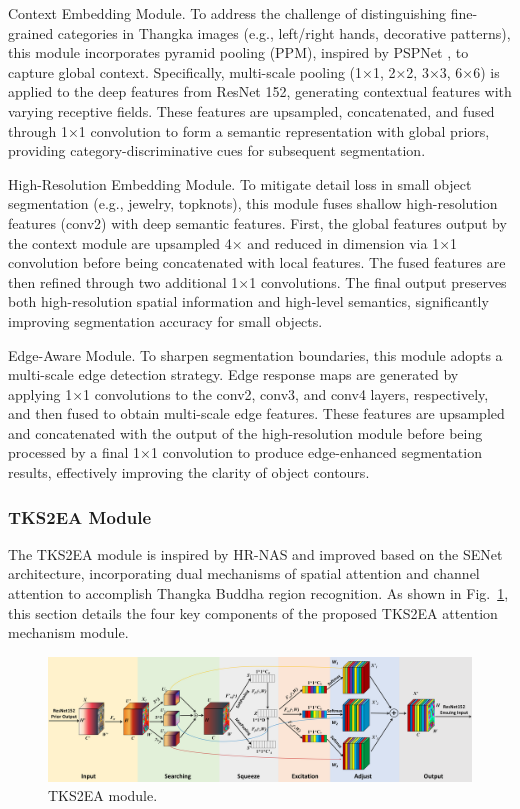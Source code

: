 \documentclass[sn-mathphys]{sn-jnl}%
\theoremstyle{thmstyleone}%
\theoremstyle{thmstyletwo}%
\theoremstyle{thmstylethree}%
\begin{document}
Context Embedding Module. To address the challenge of distinguishing fine-grained categories in Thangka images (e.g., left/right hands, decorative patterns), this module incorporates pyramid pooling (PPM), inspired by PSPNet \cite{b32}, to capture global context. Specifically, multi-scale pooling (1×1, 2×2, 3×3, 6×6) is applied to the deep features from ResNet 152, generating contextual features with varying receptive fields. These features are upsampled, concatenated, and fused through 1×1 convolution to form a semantic representation with global priors, providing category-discriminative cues for subsequent segmentation.

High-Resolution Embedding Module. To mitigate detail loss in small object segmentation (e.g., jewelry, topknots), this module fuses shallow high-resolution features (conv2) with deep semantic features. First, the global features output by the context module are upsampled 4× and reduced in dimension via 1×1 convolution before being concatenated with local features. The fused features are then refined through two additional 1×1 convolutions. The final output preserves both high-resolution spatial information and high-level semantics, significantly improving segmentation accuracy for small objects.

Edge-Aware Module. To sharpen segmentation boundaries, this module adopts a multi-scale edge detection strategy. Edge response maps are generated by applying 1×1 convolutions to the conv2, conv3, and conv4 layers, respectively, and then fused to obtain multi-scale edge features. These features are upsampled and concatenated with the output of the high-resolution module before being processed by a final 1×1 convolution to produce edge-enhanced segmentation results, effectively improving the clarity of object contours. 

\subsubsection{TKS2EA Module}
The TKS2EA module is inspired by HR-NAS \cite{b33} and improved based on the SENet \cite{b34} architecture, incorporating dual mechanisms of spatial attention and channel attention to accomplish Thangka Buddha region recognition. As shown in Fig.~\ref{fig5}, this section details the four key components of the proposed TKS2EA attention mechanism module.
\begin{figure}[htbp]
	\centerline{\includegraphics[width=1\linewidth]{fig5.png}}
	\caption{TKS2EA module.}
	\label{fig5}
\end{figure}
\end{document}
